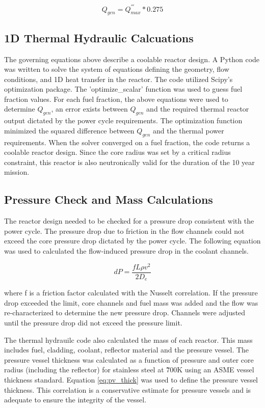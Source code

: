 \begin{equation}
    Q_{gen} = Q^{'''}_{max} * 0.275
\end{equation}

\subsection{1D Thermal Hydraulic Calcuations}
    The governing equations above describe a coolable
reactor design. A Python code was written to solve the system of equations
defining the geometry, flow conditions, and 1D heat transfer in the reactor. The
code utilized Scipy's optimization package. The 'optimize\_scalar' function was
used to guess fuel fraction values. For each fuel fraction, the above equations
were used to determine $Q_{gen}$, an error exists between $Q_{gen}$ and the
required thermal reactor output dictated by the power cycle requirements. The
optimization function minimized the squared difference between $Q_{gen}$ and the
thermal power requirements. When the solver converged on a fuel fraction, the
code returns a coolable reactor design. Since the core radius was set by a
critical radius constraint, this reactor is also neutronically valid for the
duration of the 10 year mission.

\subsection{Pressure Check and Mass Calculations}

The reactor design needed to be checked for a pressure drop consistent with the
power cycle. The pressure drop due to friction in the flow channels could not
exceed the core pressure drop dictated by the power cycle. The following
equation was used to calculated the flow-induced pressure drop in the coolant
channels.

\begin{equation}
    dP = \frac{fL\rho v^2}{2D_e}
\end{equation}

where f is a friction factor calculated with the Nusselt correlation. If the
pressure drop exceeded the limit, core channels and fuel mass was added and the
flow was re-characterized to determine the new pressure drop. Channels were adjusted
until the pressure drop did not exceed the pressure limit.

The thermal hydrauilc code also calculated the mass of each reactor. This
mass includes fuel, cladding, coolant, reflector material and the pressure
vessel. The pressure vessel thickness was calculated as a function of pressure
and outer core radius (including the reflector) for stainless steel at \~700K
using an ASME vessel thickness standard. Equation \ref{eq:pv_thick} was used to
define the pressure vessel thickness. This correlation is a conservative
estimate for pressure vessels and is adequate to ensure the integrity of the
vessel.

